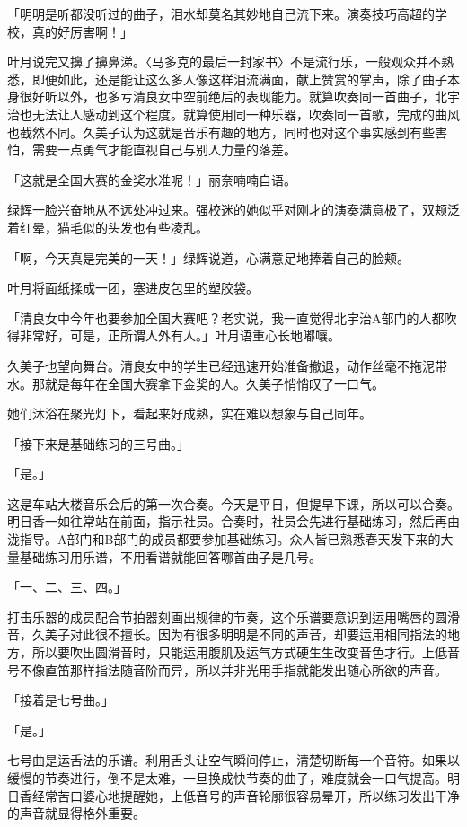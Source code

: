 \documentclass[UTF8]{ctexart}
\begin{document}
    「明明是听都没听过的曲子，泪水却莫名其妙地自己流下来。演奏技巧高超的学校，真的好厉害啊！」 

    叶月说完又擤了擤鼻涕。〈马多克的最后一封家书〉不是流行乐，一般观众并不熟悉，即便如此，还是能让这么多人像这样泪流满面，献上赞赏的掌声，除了曲子本身很好听以外，也多亏清良女中空前绝后的表现能力。就算吹奏同一首曲子，北宇治也无法让人感动到这个程度。就算使用同一种乐器，吹奏同一首歌，完成的曲风也截然不同。久美子认为这就是音乐有趣的地方，同时也对这个事实感到有些害怕，需要一点勇气才能直视自己与别人力量的落差。 

    「这就是全国大赛的金奖水准呢！」丽奈喃喃自语。 

    绿辉一脸兴奋地从不远处冲过来。强校迷的她似乎对刚才的演奏满意极了，双颊泛着红晕，猫毛似的头发也有些凌乱。 

    「啊，今天真是完美的一天！」绿辉说道，心满意足地捧着自己的脸颊。 

    叶月将面纸揉成一团，塞进皮包里的塑胶袋。 

    「清良女中今年也要参加全国大赛吧？老实说，我一直觉得北宇治A部门的人都吹得非常好，可是，正所谓人外有人。」叶月语重心长地嘟嚷。 

    久美子也望向舞台。清良女中的学生已经迅速开始准备撤退，动作丝毫不拖泥带水。那就是每年在全国大赛拿下金奖的人。久美子悄悄叹了一口气。 

    她们沐浴在聚光灯下，看起来好成熟，实在难以想象与自己同年。 

    「接下来是基础练习的三号曲。」 

    「是。」 

    这是车站大楼音乐会后的第一次合奏。今天是平日，但提早下课，所以可以合奏。明日香一如往常站在前面，指示社员。合奏时，社员会先进行基础练习，然后再由泷指导。A部门和B部门的成员都要参加基础练习。众人皆已熟悉春天发下来的大量基础练习用乐谱，不用看谱就能回答哪首曲子是几号。 

    「一、二、三、四。」 

    打击乐器的成员配合节拍器刻画出规律的节奏，这个乐谱要意识到运用嘴唇的圆滑音，久美子对此很不擅长。因为有很多明明是不同的声音，却要运用相同指法的地方，所以要吹出圆滑音时，只能运用腹肌及运气方式硬生生改变音色才行。上低音号不像直笛那样指法随音阶而异，所以并非光用手指就能发出随心所欲的声音。 

    「接着是七号曲。」 

    「是。」 

    七号曲是运舌法的乐谱。利用舌头让空气瞬间停止，清楚切断每一个音符。如果以缓慢的节奏进行，倒不是太难，一旦换成快节奏的曲子，难度就会一口气提高。明日香经常苦口婆心地提醒她，上低音号的声音轮廓很容易晕开，所以练习发出干净的声音就显得格外重要。 
\end{document}
